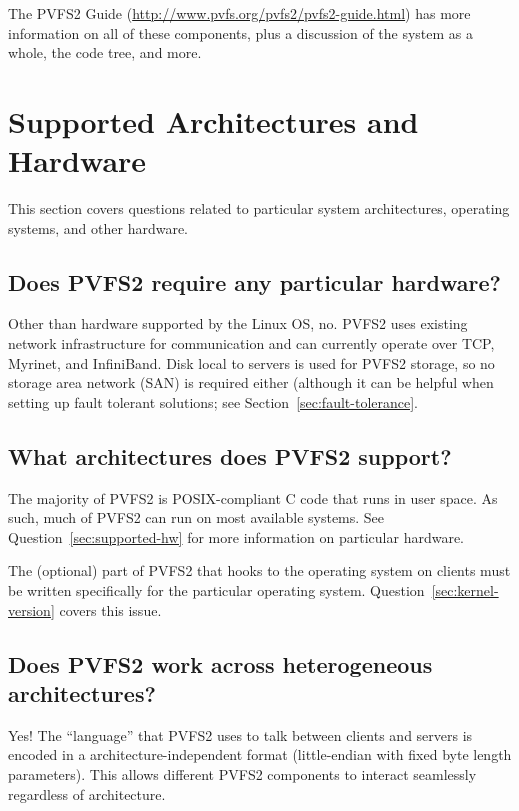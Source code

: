 \documentclass[11pt,letterpaper]{article}
\begin{document}
The PVFS2 Guide (\url{http://www.pvfs.org/pvfs2/pvfs2-guide.html}) has more
information on all of these components, plus a discussion of the system as a
whole, the code tree, and more.

%
%
\section{Supported Architectures and Hardware}

This section covers questions related to particular system architectures,
operating systems, and other hardware.

\subsection{Does PVFS2 require any particular hardware?}

Other than hardware supported by the Linux OS, no.  PVFS2 uses
existing network infrastructure for communication and can currently
operate over TCP, Myrinet, and InfiniBand.  Disk local to servers is
used for PVFS2 storage, so no storage area network (SAN) is required
either (although it can be helpful when setting up fault tolerant solutions;
see Section~\ref{sec:fault-tolerance}.

\subsection{What architectures does PVFS2 support?}
\label{sec:supported-architectures}

The majority of PVFS2 is POSIX-compliant C code that runs in user
space.  As such, much of PVFS2 can run on most available systems.  See
Question~\ref{sec:supported-hw} for more information on particular
hardware.

The (optional) part of PVFS2 that hooks to the operating system on
clients must be written specifically for the particular operating
system.  Question~\ref{sec:kernel-version} covers this issue.

\subsection{Does PVFS2 work across heterogeneous architectures?}

Yes!  The ``language'' that PVFS2 uses to talk between clients and
servers is encoded in a architecture-independent format (little-endian
with fixed byte length parameters).  This allows different PVFS2
components to interact seamlessly regardless of architecture.
\end{document}
